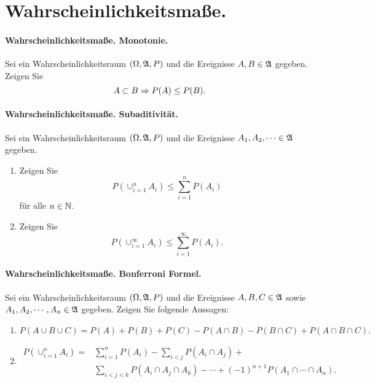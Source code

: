 \section{Wahrscheinlichkeitsmaße.}



\paragraph{Wahrscheinlichkeitsmaße. Monotonie.} Sei ein Wahrscheinlichkeitsraum
$(\Omega, \mathfrak A, P)$ und die Ereignisse $A,B \in \mathfrak A$ gegeben. Zeigen Sie 
\begin{equation*}
    A \subset B  \Rightarrow P(A) \leq P(B). 
\end{equation*}


\paragraph{Wahrscheinlichkeitsmaße. Subaditivität.} Sei ein
Wahrscheinlichkeitsraum $(\Omega, \mathfrak A, P)$ und die Ereignisse $A_1, A_2, \cdots
\in \mathfrak A$ gegeben. 
\begin{enumerate}
    \item Zeigen Sie
        \begin{equation*}
            P \left(  \cup_{i=1}^n A_i \right) \leq \sum_{i=1}^{n} P\left( A_i \right)
        \end{equation*}
        für alle $n\in \mathbb N$. 

    \item Zeigen Sie 
        \begin{equation*}
            P \left(  \cup_{i=1}^\infty A_i \right) \leq \sum_{i=1}^{\infty} P\left( A_i \right).
        \end{equation*}
\end{enumerate}


\paragraph{Wahrscheinlichkeitsmaße. Bonferroni Formel.} Sei ein
Wahrscheinlichkeitsraum $\left( \Omega, \mathfrak A, P \right)$ und die Ereignisse
$A,B,C\in \mathfrak A$ sowie $A_1, A_2, \cdots, A_n \in \mathfrak A$ gegeben.
Zeigen Sie folgende Aussagen:
\begin{enumerate}
    \item \begin{equation*}
            P \left( A \cup B \cup C \right) = 
            P(A)+P(B)+P(C) - P(A\cap B) - P(B\cap C) + P(A\cap B \cap C). 
        \end{equation*}

    \item
        \begin{align*}
            P\left( \cup_{i=1}^{n} A_i \right) =&
            \sum_{i=1}^{n} P(A_i) - \sum_{i<j} P(A_i \cap A_j) + \\
            & \sum_{i<j<k} P(A_i \cap A_j \cap A_k) - \cdots + 
            (-1)^{n+1} P\left( A_1 \cap \cdots \cap A_n \right). 
        \end{align*}
\end{enumerate}




